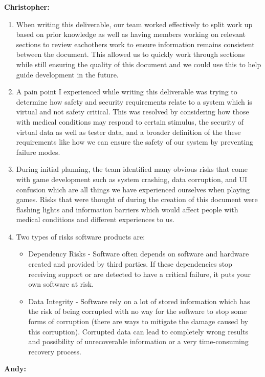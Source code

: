 \documentclass{article}
\begin{document}
\textbf{Christopher:}

\begin{enumerate}
	\item When writing this deliverable, our team worked effectively to split work up based on prior knowledge as well as having members working on relevant sections to review eachothers work to ensure information remains consistent between the document. This allowed us to quickly work through sections while still ensuring the quality of this document and we could use this to help guide development in the future.
	\item A pain point I experienced while writing this deliverable was trying to determine how safety and security requirements relate to a system which is virtual and not safety critical. This was resolved by considering how those with medical conditions may respond to certain stimulus, the security of virtual data as well as tester data, and a broader definition of the these requirements like how we can ensure the safety of our system by preventing failure modes.
	\item During initial planning, the team identified many obvious risks that come with game development such as system crashing, data corruption, and UI confusion which are all things we have experienced ourselves when playing games. Risks that were thought of during the creation of this document were flashing lights and information barriers which would affect people with medical conditions and different experiences to us.
	\item Two types of risks software products are:
	\begin{itemize}
		\item Dependency Risks - Software often depends on software and hardware created and provided by third parties. If these dependencies stop receiving support or are detected to have a critical failure, it puts your own software at risk.
		\item Data Integrity - Software rely on a lot of stored information which has the risk of being corrupted with no way for the software to stop some forms of corruption (there are ways to mitigate the damage caused by this corruption). Corrupted data can lead to completely wrong results and possibility of unrecoverable information or a very time-consuming recovery process.
		\end{itemize}
\end{enumerate}

\textbf{Andy:}
\end{document}
